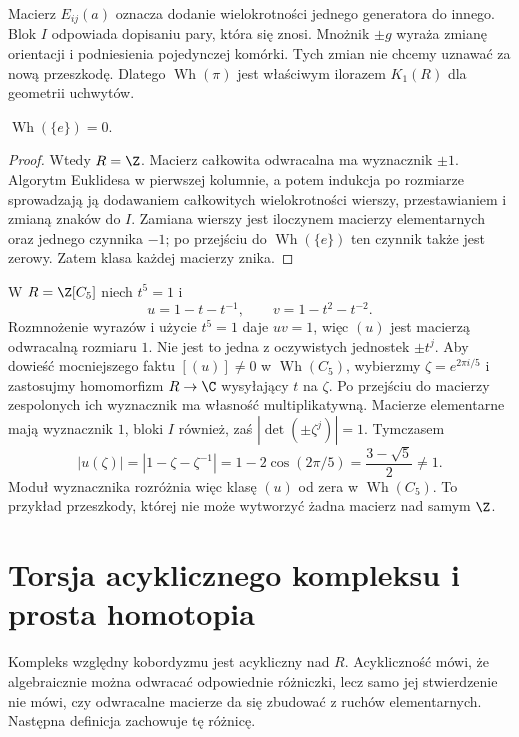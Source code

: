 Macierz $E_{ij}(a)$ oznacza dodanie wielokrotności
jednego generatora do innego. Blok $I$ odpowiada
dopisaniu pary, która się znosi. Mnożnik $\pm g$
wyraża zmianę orientacji i podniesienia pojedynczej
komórki. Tych zmian nie chcemy uznawać za nową
przeszkodę. Dlatego $\operatorname{Wh}(\pi)$ jest
właściwym ilorazem $K_1(R)$ dla geometrii uchwytów.

\begin{stwierdzenie}
\label{prop:wh-trywialna-20}
$\operatorname{Wh}(\{e\})=0$.
\end{stwierdzenie}
\begin{proof}
Wtedy $R=\Z$. Macierz całkowita odwracalna ma
wyznacznik $\pm1$. Algorytm Euklidesa w pierwszej
kolumnie, a potem indukcja po rozmiarze sprowadzają
ją dodawaniem całkowitych wielokrotności wierszy,
przestawianiem i zmianą znaków do $I$. Zamiana
wierszy jest iloczynem macierzy elementarnych oraz
jednego czynnika $-1$; po przejściu do
$\operatorname{Wh}(\{e\})$ ten czynnik także jest
zerowy. Zatem klasa każdej macierzy znika.
\end{proof}

\begin{przyklad}
\label{prz:wh-c5-20}
W $R=\Z[C_5]$ niech $t^5=1$ i
\[
 u=1-t-t^{-1},\qquad v=1-t^2-t^{-2}.
\]
Rozmnożenie wyrazów i użycie $t^5=1$ daje $uv=1$,
więc $(u)$ jest macierzą odwracalną rozmiaru $1$.
Nie jest to jedna z oczywistych jednostek $\pm t^j$.
Aby dowieść mocniejszego faktu $[(u)]\ne0$ w
$\operatorname{Wh}(C_5)$, wybierzmy
$\zeta=e^{2\pi i/5}$ i zastosujmy homomorfizm
$R\to\C$ wysyłający $t$ na $\zeta$.
Po przejściu do macierzy zespolonych ich wyznacznik
ma własność multiplikatywną. Macierze elementarne
mają wyznacznik $1$, bloki $I$ również, zaś
$|\det(\pm\zeta^j)|=1$. Tymczasem
\[
 |u(\zeta)|=|1-\zeta-\zeta^{-1}|
 =1-2\cos(2\pi/5)=\frac{3-\sqrt5}{2}\ne1.
\]
Moduł wyznacznika rozróżnia więc klasę $(u)$
od zera w $\operatorname{Wh}(C_5)$. To przykład
przeszkody, której nie może wytworzyć żadna macierz
nad samym $\Z$.
\end{przyklad}

\section{Torsja acyklicznego kompleksu i prosta homotopia}
\label{sec:torsja-kompleksu-20}

Kompleks względny kobordyzmu jest acykliczny nad $R$.
Acykliczność mówi, że algebraicznie można odwracać
odpowiednie różniczki, lecz samo jej stwierdzenie nie
mówi, czy odwracalne macierze da się zbudować z
ruchów elementarnych. Następna definicja zachowuje
tę różnicę.

